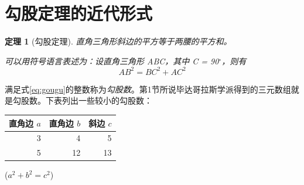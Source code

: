 \documentclass[UTF8]{ctexart}
\newtheorem{thm}{定理}
\begin{document}
\section{勾股定理的近代形式}
\begin{thm}[勾股定理]
直角三角形斜边的平方等于两腰的平方和。

可以用符号语言表述为：设直角三角形 ABC，其中 \angle C = 90$^\circ$，则有
\begin{equation}\label{eq:gougu}
AB^2=BC^2+AC^2
\end{equation}
\end{thm}
满足式\eqref{eq:gougu}的整数称为\emph{勾股数}。第1节所说毕达哥拉斯学派得到的三元数组就是勾股数。下表列出一些较小的勾股数：
\begin{table}[H]
\begin{tabular}{|rrr|}
\hline
直角边 $a$ & 直角边 $b$ & 斜边 $c$\\
\hline
3 & 4 & 5 \\
5 & 12 & 13 \\
\hline
\end{tabular}
\qquad
($a^2 + b^2 = c^2$)
\end{table}
\nocite{Shiye}

\end{document}
